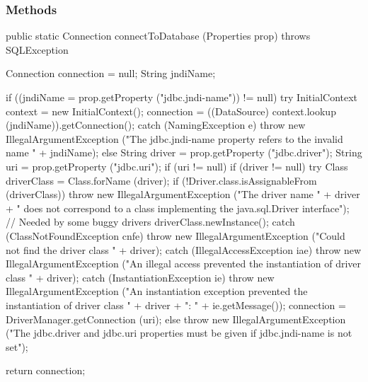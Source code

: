 \subsubsection*{Methods}
\begin{code}

   public static Connection connectToDatabase (Properties prop)
            throws SQLException \begin{hide} {
      Connection connection = null;
      String jndiName;
        
      if ((jndiName = prop.getProperty ("jdbc.jndi-name")) != null)
      {
         try
         {
            InitialContext context = new InitialContext();
            connection = ((DataSource) context.lookup (jndiName)).getConnection();
         }
         catch (NamingException e)
         {
            throw new IllegalArgumentException
                  ("The jdbc.jndi-name property refers to the invalid name " + jndiName);
         }
      }
      else
      {
         String driver = prop.getProperty ("jdbc.driver");
         String uri = prop.getProperty ("jdbc.uri");
         if (uri != null)
         {
            if (driver != null) {
               try
               {
                  Class driverClass = Class.forName (driver);
                  if (!Driver.class.isAssignableFrom (driverClass))
                     throw new IllegalArgumentException
                        ("The driver name " + driver +
                     " does not correspond to a class implementing the java.sql.Driver interface");
                  // Needed by some buggy drivers
                  driverClass.newInstance();
               }
               catch (ClassNotFoundException cnfe) {
                  throw new IllegalArgumentException ("Could not find the driver class " + driver);
               }
               catch (IllegalAccessException iae) {
                  throw new IllegalArgumentException
                        ("An illegal access prevented the instantiation of driver class " + driver);
               }
               catch (InstantiationException ie) {
                  throw new IllegalArgumentException
                        ("An instantiation exception prevented the instantiation of driver class " + driver +
                                ": " + ie.getMessage());
               }
            }
            connection = DriverManager.getConnection (uri);
         }
         else
         {
            throw new IllegalArgumentException
                ("The jdbc.driver and jdbc.uri properties must be given if jdbc.jndi-name is not set");
         }            
      }

      return connection;
   }\end{hide}
\end{code}
